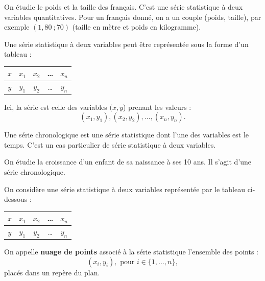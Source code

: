 \documentclass[a4paper, 12pt]{report}
\begin{document}
\begin{ex}
On étudie le poids et la taille des français. C'est une série statistique à deux variables quantitatives.
Pour un français donné, on a un couple (poids, taille), par exemple $(1,80~ ; 70)$ (taille en mètre et poids en kilogramme).
\end{ex}

\begin{rmq}
Une série statistique à deux variables peut être représentée sous la forme d'un tableau :
\begin{center}
\begin{tabular}{ |c||c|c|c|c| } 
 \hline
 $x$ & $x_1$ & $x_2$ & \dots & $x_n$ \\ 
 \hline
$y$ & $y_1$ & $y_2$ & \dots & $y_n$ \\ 
 \hline
\end{tabular}
\end{center}
Ici, la série est celle des variables $(x,y$) prenant les valeurs :
\[ (x_1, y_1), (x_2, y_2), \dots, (x_n, y_n). \]
\end{rmq}

\begin{defn}
Une série chronologique est une série statistique dont l'une des variables est le temps.
C'est un cas particulier de série statistique à deux variables.
\end{defn}

\begin{ex}
On étudie la croissance d'un enfant de sa naissance à ses 10 ans. Il s'agit d'une série chronologique.
\end{ex}

\begin{defn}
On considère une série statistique à deux variables représentée par le tableau ci-dessous :
\begin{center}
\begin{tabular}{ |c||c|c|c|c| } 
 \hline
 $x$ & $x_1$ & $x_2$ & \dots & $x_n$ \\ 
 \hline
$y$ & $y_1$ & $y_2$ & \dots & $y_n$ \\ 
 \hline
\end{tabular}
\end{center}
On appelle \textbf{nuage de points} associé à la série statistique l'ensemble des points :
\[ (x_i, y_i), \text{ pour } i \in \{1, \dots , n\} , \]
placés dans un repère du plan.
\end{defn}
\end{document}
